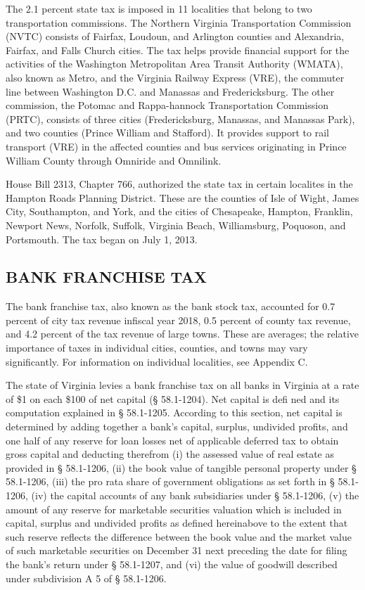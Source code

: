 \documentclass[
]{book}
\begin{document}
The 2.1 percent state tax is imposed in 11 localities that belong to two transportation commissions. The Northern Virginia Transportation Commission (NVTC) consists of Fairfax, Loudoun, and Arlington counties and Alexandria, Fairfax, and Falls Church cities. The tax helps provide financial support for the activities of the Washington Metropolitan Area Transit Authority (WMATA), also known as Metro, and the Virginia Railway Express (VRE), the commuter line between Washington D.C. and Manassas and Fredericksburg. The other commission, the Potomac and Rappa-hannock Transportation Commission (PRTC), consists of three cities (Fredericksburg, Manassas, and Manassas Park), and two counties (Prince William and Stafford). It provides support to rail transport (VRE) in the affected counties and bus services originating in Prince William County through Omniride and Omnilink.

House Bill 2313, Chapter 766, authorized the state tax in certain localites in the Hampton Roads Planning District. These are the counties of Isle of Wight, James City, Southampton, and York, and the cities of Chesapeake, Hampton, Franklin, Newport News, Norfolk, Suffolk, Virginia Beach, Williamsburg, Poquoson, and Portsmouth. The tax began on July 1, 2013.

\hypertarget{bank-franchise-tax}{%
\subsection{BANK FRANCHISE TAX}\label{bank-franchise-tax}}

The bank franchise tax, also known as the bank stock tax, accounted for 0.7 percent of city tax revenue infiscal year 2018, 0.5 percent of county tax revenue, and 4.2 percent of the tax revenue of large towns. These are averages; the relative importance of taxes in individual cities, counties, and towns may vary significantly. For information on individual localities, see Appendix C.

The state of Virginia levies a bank franchise tax on all banks in Virginia at a rate of \$1 on each \$100 of net capital (§ 58.1-1204). Net capital is defi ned and its computation explained in § 58.1-1205. According to this section, net capital is determined by adding together a bank's capital, surplus, undivided profits, and one half of any reserve for loan losses net of applicable deferred tax to obtain gross capital and deducting therefrom (i) the assessed value of real estate as provided in § 58.1-1206, (ii) the book value of tangible personal property under § 58.1-1206, (iii) the pro rata share of government obligations as set forth in § 58.1-1206, (iv) the capital accounts of any bank subsidiaries under § 58.1-1206, (v) the amount of any reserve for marketable securities valuation which is included in capital, surplus and undivided profits as defined hereinabove to the extent that such reserve reflects the difference between the book value and the market value of such marketable securities on December 31 next preceding the date for filing the bank's return under § 58.1-1207, and (vi) the value of goodwill described under subdivision A 5 of § 58.1-1206.
\end{document}
